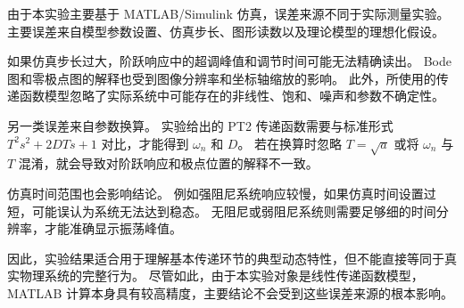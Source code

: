 由于本实验主要基于 MATLAB/Simulink 仿真，误差来源不同于实际测量实验。
主要误差来自模型参数设置、仿真步长、图形读数以及理论模型的理想化假设。

如果仿真步长过大，阶跃响应中的超调峰值和调节时间可能无法精确读出。
Bode 图和零极点图的解释也受到图像分辨率和坐标轴缩放的影响。
此外，所使用的传递函数模型忽略了实际系统中可能存在的非线性、饱和、噪声和参数不确定性。

另一类误差来自参数换算。
实验给出的 PT2 传递函数需要与标准形式 $T^2s^2+2DTs+1$ 对比，才能得到 $\omega_n$ 和 $D$。
若在换算时忽略 $T=\sqrt{a}$ 或将 $\omega_n$ 与 $T$ 混淆，就会导致对阶跃响应和极点位置的解释不一致。

仿真时间范围也会影响结论。
例如强阻尼系统响应较慢，如果仿真时间设置过短，可能误认为系统无法达到稳态。
无阻尼或弱阻尼系统则需要足够细的时间分辨率，才能准确显示振荡峰值。

因此，实验结果适合用于理解基本传递环节的典型动态特性，但不能直接等同于真实物理系统的完整行为。
尽管如此，由于本实验对象是线性传递函数模型，MATLAB 计算本身具有较高精度，主要结论不会受到这些误差来源的根本影响。

